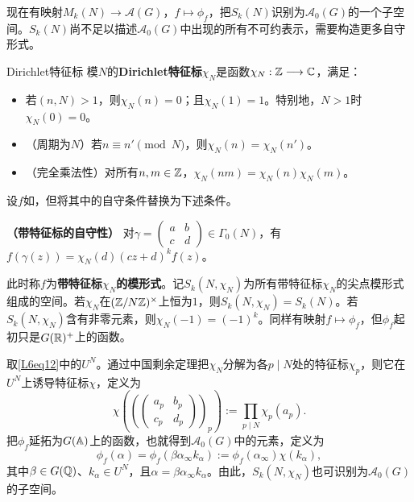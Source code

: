 现在有映射$M_k(N)\longrightarrow\mathcal A(G)$，$f\mapsto\phi_f$，把$S_k(N)$识别为$\mathcal A_0(G)$的一个子空间。$S_k(N)$尚不足以描述$\mathcal A_0(G)$中出现的所有不可约表示，需要构造更多自守形式。
\begin{definition}{Dirichlet特征标}\label{L6S2O4}
模$N$的\textbf{Dirichlet特征标}$\chi_N$是函数$\chi_N:\mathbb{Z}\longrightarrow\mathbb{C}$，满足：
\begin{itemize}
\item 若$(n,N)>1$，则$\chi_N(n)=0$；且$\chi_N(1)=1$。特别地，$N>1$时$\chi_N(0)=0$。
\item （周期为$N$）若$n\equiv n'\pmod N$，则$\chi_N(n)=\chi_N(n')$。
\item （完全乘法性）对所有$n,m\in\mathbb{Z}$，$\chi_N(nm)=\chi_N(n)\chi_N(m)$。
\end{itemize}
\end{definition}
设$f$如，但将其中的自守条件替换为下述条件。
\begin{property}\textbf{（带特征标的自守性）}
对$\gamma=\begin{pmatrix}a&b\\c&d\end{pmatrix}\in\Gamma_0(N)$，有$f(\gamma(z))=\chi_N(d)(cz+d)^k f(z)$。
\end{property}
此时称$f$为\textbf{带特征标$\chi_N$的模形式}。记$S_k(N,\chi_N)$为所有带特征标$\chi_N$的尖点模形式组成的空间。若$\chi_N$在$(\mathbb{Z}/N\mathbb{Z})^\times$上恒为$1$，则$S_k(N,\chi_N)=S_k(N)$。若$S_k(N,\chi_N)$含有非零元素，则$\chi_N(-1)=(-1)^k$。同样有映射$f\mapsto\phi_f$，但$\phi_f$起初只是$G(\mathbb{R})^+$上的函数。

取\eqref{L6eq12}中的$U^N$。通过中国剩余定理把$\chi_N$分解为各$p\mid N$处的特征标$\chi_p$，则它在$U^N$上诱导特征标$\chi$，定义为
\[\chi\!\left(\left(\begin{pmatrix}a_p&b_p\\c_p&d_p\end{pmatrix}\right)_p\right):=\prod_{p\mid N}\chi_p(a_p).\]
把$\phi_f$延拓为$G(\mathbb{A})$上的函数，也就得到$\mathcal A_0(G)$中的元素，定义为
\[\phi_f(\alpha)=\phi_f(\beta\alpha_\infty k_\alpha):=\phi_f(\alpha_\infty)\chi(k_\alpha),\]
其中$\beta\in G(\mathbb{Q})$、$k_\alpha\in U^N$，且$\alpha=\beta\alpha_\infty k_\alpha$。由此，$S_k(N,\chi_N)$也可识别为$\mathcal A_0(G)$的子空间。
